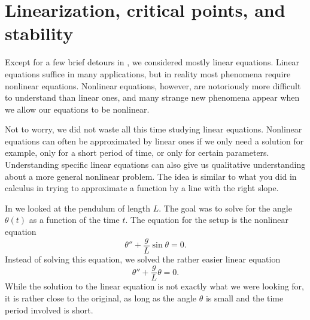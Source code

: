 \section{Linearization, critical points, and stability}
\label{linearization:section}




Except for a few brief detours in ,
we considered mostly linear
equations.  Linear equations suffice in many applications, but in reality
most phenomena require nonlinear equations.  Nonlinear equations, however,
are notoriously more difficult to understand than linear ones, and 
many strange new phenomena appear when we allow our equations to be
nonlinear.

Not to worry, we did not waste all this time studying linear equations.
Nonlinear equations can often be approximated by linear ones if we only need
a solution  for example, only for a short period of time, or
only for certain parameters.  Understanding specific linear equations can
also give us qualitative understanding about a more general nonlinear
problem.  The idea is similar to what you did in calculus in trying to
approximate a function by a line with the right slope.

\begin{mywrapfigsimp}{1.45in}{1.75in}
\noindent
{}
\end{mywrapfigsimp}
In  we looked at the pendulum of %
length $L$.  The goal was to solve for the angle $\theta(t)$ as
a function of the time $t$.  The equation for the setup is
the nonlinear equation
\begin{equation*}
\theta'' + \frac{g}{L} \sin \theta = 0 .
\end{equation*}
Instead of solving this equation, we solved the rather easier linear
equation
\begin{equation*}
\theta'' + \frac{g}{L} \theta = 0 .
\end{equation*}
While the solution to the linear equation is not exactly what we were
looking for, it is rather close to the original, as long as the
angle $\theta$ is small and the time period involved is short.

